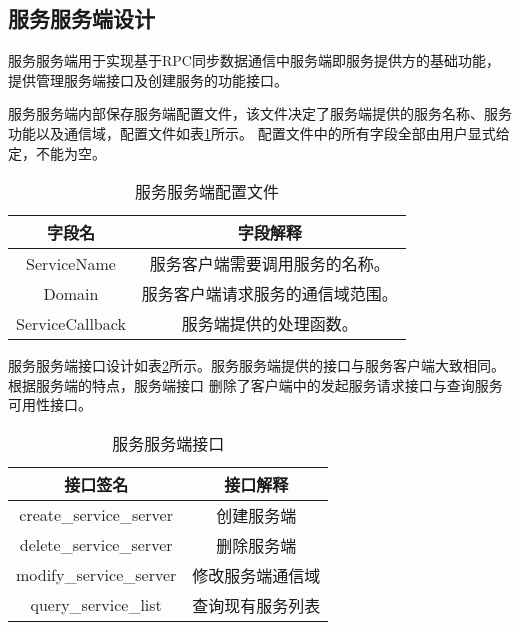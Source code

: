 
\subsection{服务服务端设计}
服务服务端用于实现基于RPC同步数据通信中服务端即服务提供方的基础功能，提供管理服务端接口及创建服务的功能接口。

服务服务端内部保存服务端配置文件，该文件决定了服务端提供的服务名称、服务功能以及通信域，配置文件如表\ref{service_server_config_file}所示。
配置文件中的所有字段全部由用户显式给定，不能为空。
\begin{table}[H]
  \centering\small
  \caption{服务服务端配置文件}
  \renewcommand\arraystretch{1.05}
  \label{service_server_config_file}
  \begin{tabular}{cc}
    \toprule
    字段名 & 字段解释 \\
    \midrule
    ServiceName & 服务客户端需要调用服务的名称。\\
    Domain & 服务客户端请求服务的通信域范围。\\
    ServiceCallback & 服务端提供的处理函数。\\
    \bottomrule
  \end{tabular}
\end{table}

服务服务端接口设计如表\ref{service_server_interface}所示。服务服务端提供的接口与服务客户端大致相同。根据服务端的特点，服务端接口
删除了客户端中的发起服务请求接口与查询服务可用性接口。
\begin{table}[htb]
  \centering\small
  \caption{服务服务端接口}
  \renewcommand\arraystretch{1.2}
  \label{service_server_interface}
  \begin{tabular}{cc}
    \toprule
    接口签名 & 接口解释 \\
    \midrule
    create\_service\_server & 创建服务端 \\
    delete\_service\_server & 删除服务端\\
    modify\_service\_server & 修改服务端通信域\\
    query\_service\_list & 查询现有服务列表\\
    \bottomrule
  \end{tabular}
\end{table}

